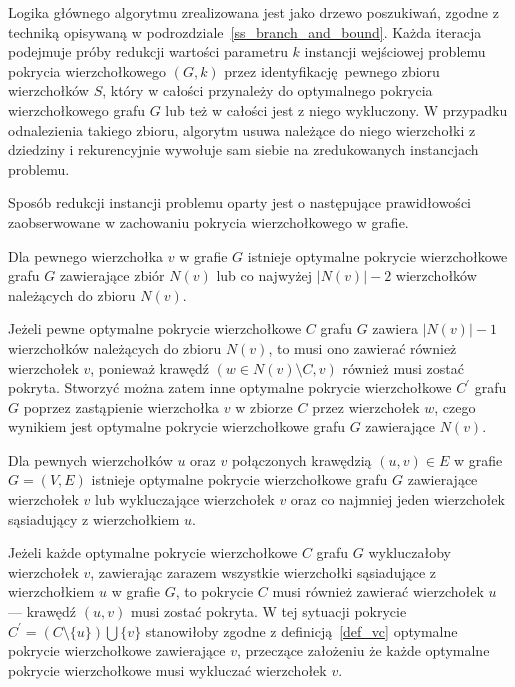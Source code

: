 \par{
  Logika głównego algorytmu zrealizowana jest jako drzewo poszukiwań, zgodne z techniką opisywaną w podrozdziale~\ref{ss_branch_and_bound}.
  Każda iteracja podejmuje próby redukcji wartości parametru $k$ instancji wejściowej problemu pokrycia wierzchołkowego $(G, k)$ przez identyfikację pewnego zbioru wierzchołków $S$, który w całości przynależy do optymalnego pokrycia wierzchołkowego grafu $G$ lub też w całości jest z niego wykluczony.
  W przypadku odnalezienia takiego zbioru, algorytm usuwa należące do niego wierzchołki z dziedziny i rekurencyjnie wywołuje sam siebie na zredukowanych instancjach problemu.

  Sposób redukcji instancji problemu oparty jest o następujące prawidłowości zaobserwowane w zachowaniu pokrycia wierzchołkowego w grafie.
  \begin{theorem}
    Dla pewnego wierzchołka $v$ w grafie $G$ istnieje optymalne pokrycie wierzchołkowe grafu $G$ zawierające zbiór $N(v)$ lub co najwyżej $|N(v)| - 2$ wierzchołków należących do zbioru $N(v)$.
  \end{theorem}
  \begin{bproof}
    Jeżeli pewne optymalne pokrycie wierzchołkowe $C$ grafu $G$ zawiera $|N(v)|-1$ wierzchołków należących do zbioru $N(v)$, to musi ono zawierać również wierzchołek $v$, ponieważ krawędź $(w \in N(v) \setminus C, v)$ również musi zostać pokryta.
    Stworzyć można zatem inne optymalne pokrycie wierzchołkowe $C^\prime$ grafu $G$ poprzez zastąpienie wierzchołka $v$ w zbiorze $C$ przez wierzchołek $w$, czego wynikiem jest optymalne pokrycie wierzchołkowe grafu $G$ zawierające $N(v)$.
  \end{bproof}
  \begin{theorem}
    Dla pewnych wierzchołków $u$ oraz $v$ połączonych krawędzią $(u, v) \in E$ w grafie $G=(V, E)$ istnieje optymalne pokrycie wierzchołkowe grafu $G$ zawierające wierzchołek $v$ lub wykluczające wierzchołek $v$ oraz co najmniej jeden wierzchołek sąsiadujący z wierzchołkiem $u$.
  \end{theorem}
  \begin{bproof}
    Jeżeli każde optymalne pokrycie wierzchołkowe $C$ grafu $G$ wykluczałoby wierzchołek $v$, zawierając zarazem wszystkie wierzchołki sąsiadujące z wierzchołkiem $u$ w grafie $G$, to pokrycie $C$ musi również zawierać wierzchołek $u$ --- krawędź $(u, v)$ musi zostać pokryta.
    W tej sytuacji pokrycie $C^\prime=(C \setminus \{u\}) \bigcup \{v\}$ stanowiłoby zgodne z definicją~\ref{def_vc} optymalne pokrycie wierzchołkowe zawierające $v$, przeczące założeniu że każde optymalne pokrycie wierzchołkowe musi wykluczać wierzchołek $v$.

\end{bproof}}

